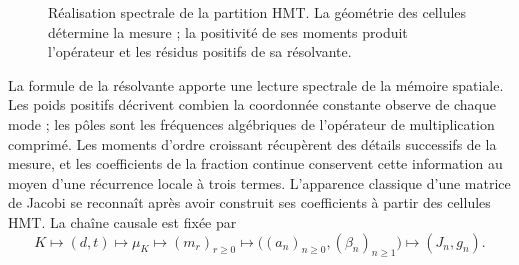 \begin{figure}[htbp]
\centering
{}
\caption{Réalisation spectrale de la partition HMT. La géométrie des
cellules détermine la mesure ; la positivité de ses moments produit
l’opérateur et les résidus positifs de sa résolvante.}
\label{fig:jacobi-generated}
\end{figure}

La formule de la résolvante apporte une lecture spectrale de la mémoire
spatiale. Les poids positifs décrivent combien la coordonnée
constante observe de chaque mode ; les pôles sont les fréquences algébriques de
l’opérateur de multiplication comprimé. Les moments d’ordre croissant
récupèrent des détails successifs de la mesure, et les coefficients de la
fraction continue conservent cette information au moyen d’une récurrence
locale à trois termes. L’apparence classique d’une matrice de Jacobi
se reconnaît après avoir construit ses coefficients à partir des
cellules HMT. La chaîne causale est fixée par
\[
 K\longmapsto(d,t)\longmapsto\mu_K\longmapsto(m_r)_{r\geq0}
 \longmapsto\bigl((a_n)_{n\geq0},(\beta_n)_{n\geq1}\bigr)
 \longmapsto(J_n,g_n).
\]

